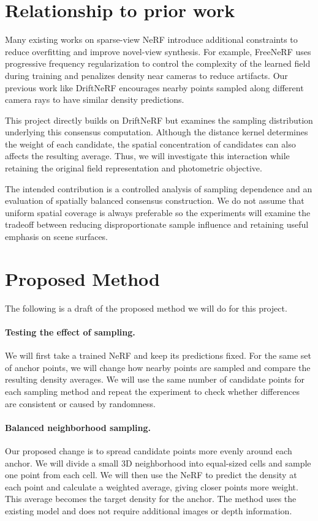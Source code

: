 \documentclass[sigconf]{acmart}
\begin{document}
\section{Relationship to prior work}

Many existing works on sparse-view NeRF introduce additional constraints to reduce overfitting and improve novel-view synthesis. For example, FreeNeRF uses progressive frequency regularization to control the complexity of the learned field during training and penalizes density near cameras to reduce artifacts. Our previous work like DriftNeRF encourages nearby points sampled along different camera rays to have similar density predictions. 

This project directly builds on DriftNeRF but examines the sampling distribution underlying this consensus computation. Although the distance kernel determines the weight of each candidate, the spatial concentration of candidates can also affects the resulting average. Thus, we will investigate this interaction while retaining the original field representation and photometric objective.

The intended contribution is a controlled analysis of sampling dependence and an evaluation of spatially balanced consensus construction. We do not assume that uniform spatial coverage is always preferable so the experiments will examine the tradeoff between reducing disproportionate sample influence and retaining useful emphasis on scene surfaces.


\section{Proposed Method}

The following is a draft of the proposed method we will do for this project. 

\paragraph{Testing the effect of sampling.}
We will first take a trained NeRF and keep its predictions fixed. For the same set of anchor points, we will change how nearby points are sampled and compare the resulting density averages. We will use the same number of candidate points for each sampling method and repeat the experiment to check whether differences are consistent or caused by randomness.

\paragraph{Balanced neighborhood sampling.}
Our proposed change is to spread candidate points more evenly around each anchor. We will divide a small 3D neighborhood into equal-sized cells and sample one point from each cell. We will then use the NeRF to predict the density at each point and calculate a weighted average, giving closer points more weight. This average becomes the target density for the anchor. The method uses the existing model and does not require additional images or depth information.
\end{document}
